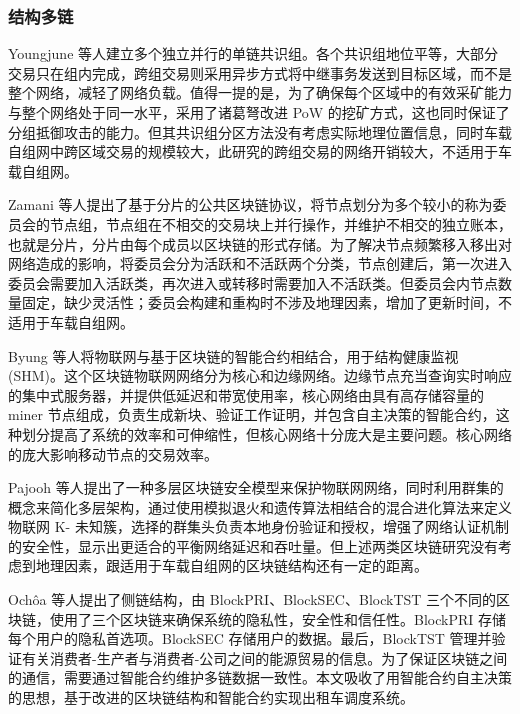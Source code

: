 \subsubsection{结构多链}
Youngjune 等人建立多个独立并行的单链共识组。各个共识组地位平等，大部分交易只在组内完成，跨组交易则采用异步方式将中继事务发送到目标区域，而不是整个网络，减轻了网络负载。值得一提的是，为了确保每个区域中的有效采矿能力与整个网络处于同一水平，采用了诸葛弩改进 PoW 的挖矿方式，这也同时保证了分组抵御攻击的能力。但其共识组分区方法没有考虑实际地理位置信息，同时车载自组网中跨区域交易的规模较大，此研究的跨组交易的网络开销较大，不适用于车载自组网。\par
Zamani 等人提出了基于分片的公共区块链协议，将节点划分为多个较小的称为委员会的节点组，节点组在不相交的交易块上并行操作，并维护不相交的独立账本，也就是分片，分片由每个成员以区块链的形式存储。为了解决节点频繁移入移出对网络造成的影响，将委员会分为活跃和不活跃两个分类，节点创建后，第一次进入委员会需要加入活跃类，再次进入或转移时需要加入不活跃类。但委员会内节点数量固定，缺少灵活性；委员会构建和重构时不涉及地理因素，增加了更新时间，不适用于车载自组网。\par
Byung 等人将物联网与基于区块链的智能合约相结合，用于结构健康监视 (SHM)。这个区块链物联网网络分为核心和边缘网络。边缘节点充当查询实时响应的集中式服务器，并提供低延迟和带宽使用率，核心网络由具有高存储容量的miner 节点组成，负责生成新块、验证工作证明，并包含自主决策的智能合约，这种划分提高了系统的效率和可伸缩性，但核心网络十分庞大是主要问题。核心网络的庞大影响移动节点的交易效率。\par
Pajooh 等人提出了一种多层区块链安全模型来保护物联网网络，同时利用群集的概念来简化多层架构，通过使用模拟退火和遗传算法相结合的混合进化算法来定义物联网 K- 未知簇，选择的群集头负责本地身份验证和授权，增强了网络认证机制的安全性，显示出更适合的平衡网络延迟和吞吐量。但上述两类区块链研究没有考虑到地理因素，跟适用于车载自组网的区块链结构还有一定的距离。\par
Ochôa 等人提出了侧链结构，由 BlockPRI、BlockSEC、BlockTST 三个不同的区块链，使用了三个区块链来确保系统的隐私性，安全性和信任性。BlockPRI 存储每个用户的隐私首选项。BlockSEC 存储用户的数据。最后，BlockTST 管理并验证有关消费者-生产者与消费者-公司之间的能源贸易的信息。为了保证区块链之间的通信，需要通过智能合约维护多链数据一致性。本文吸收了用智能合约自主决策的思想，基于改进的区块链结构和智能合约实现出租车调度系统。

